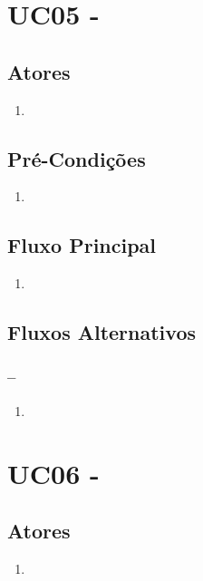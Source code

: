 \section{UC05 -}


\subsection{Atores}

\begin{enumerate}
  \item
\end{enumerate}

\subsection{Pré-Condições}
\begin{enumerate}
  \item
\end{enumerate}

\subsection{Fluxo Principal}
\begin{enumerate}
  \item
\end{enumerate}

\subsection{Fluxos Alternativos}

\subsubsection{--}

\begin{enumerate}
  \item
\end{enumerate}

\section{UC06 -}


\subsection{Atores}

\begin{enumerate}
  \item
\end{enumerate}

